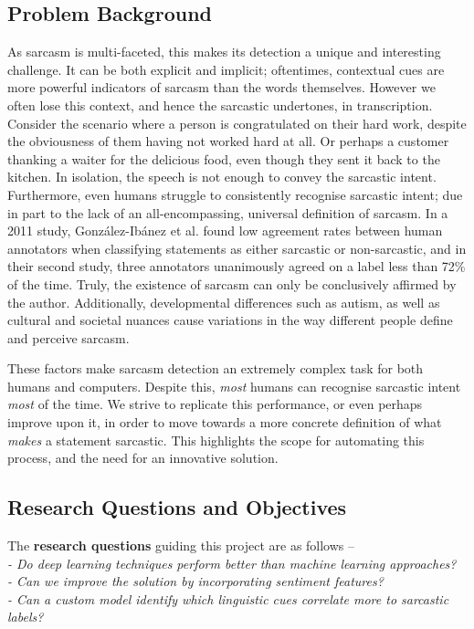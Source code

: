 \documentclass[12pt,a4paper]{article}
\begin{document}
\subsection{Problem Background}
\noindent As sarcasm is multi-faceted, this makes its detection a unique and interesting challenge. It can be both explicit and implicit; oftentimes, contextual cues are more powerful indicators of sarcasm than the words themselves. However we often lose this context, and hence the sarcastic undertones, in transcription. Consider the scenario where a person is congratulated on their hard work, despite the obviousness of them having not worked hard at all. Or perhaps a customer thanking a waiter for the delicious food, even though they sent it back to the kitchen. In isolation, the speech is not enough to convey the sarcastic intent. Furthermore, even humans struggle to consistently recognise sarcastic intent; due in part to the lack of an all-encompassing, universal definition of sarcasm. In a 2011 study, Gonz{\'a}lez-Ib{\'a}nez et al. \cite{gonzalez2011identifying} found low agreement rates between human annotators when classifying statements as either sarcastic or non-sarcastic, and in their second study, three annotators unanimously agreed on a label less than 72\% of the time. Truly, the existence of sarcasm can only be conclusively affirmed by the author. Additionally, developmental differences such as autism, as well as cultural and societal nuances cause variations in the way different people define and perceive sarcasm.

These factors make sarcasm detection an extremely complex task for both humans and computers. Despite this, \textit{most} humans can recognise sarcastic intent \textit{most} of the time. We strive to replicate this performance, or even perhaps improve upon it, in order to move towards a more concrete definition of what \textit{makes} a statement sarcastic. This highlights the scope for automating this process, and the need for an innovative solution.

\subsection{Research Questions and Objectives}
\noindent The \textbf{research questions} guiding this project are as follows --\\
\indent \textit{- Do deep learning techniques perform better than machine learning approaches?}\\ 
\indent \textit{- Can we improve the solution by incorporating sentiment features?}\\ 
\indent \textit{- Can a custom model identify which linguistic cues correlate more to sarcastic labels?}\\
\end{document}
